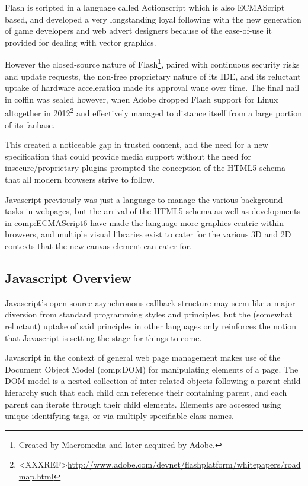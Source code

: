 Flash is scripted in a language called Actionscript which is also ECMAScript based, and developed a very longstanding loyal following with the new generation of game developers and web advert designers because of the ease-of-use it provided for dealing with vector graphics.

However the closed-source nature of Flash\footnote{Created by Macromedia and later acquired by Adobe.}, paired with continuous security risks and update requests, the non-free proprietary nature of its IDE, and its reluctant uptake of hardware acceleration made its approval wane over time. The final nail in coffin was sealed however, when Adobe dropped Flash support for Linux altogether in 2012\footnote{<XXXREF>\url{http://www.adobe.com/devnet/flashplatform/whitepapers/roadmap.html}} and effectively managed to distance itself from a large portion of its fanbase. 

This created a noticeable gap in trusted content, and the need for a new specification that could provide media support without the need for insecure/proprietary plugins prompted the conception of the HTML5 schema that all modern browsers strive to follow.

Javascript previously was just a language to manage the various background tasks in webpages, but the arrival of the HTML5 schema as well as developments in \gls{comp:ECMAScript6} have made the language more graphics-centric within browsers, and multiple visual libraries exist to cater for the various 3D and 2D contexts that the new canvas element can cater for\citep{ecmascript2011ecmascript}. 


\subsection{Javascript Overview}\label{ref:haplo:javaover}

Javascript's open-source asynchronous callback structure may seem like a major diversion from standard programming styles and principles, but the (somewhat reluctant) uptake of said principles in other languages only reinforces the notion that Javascript is setting the stage for things to come.

Javascript in the context of general web page management makes use of the Document Object Model (\gls{comp:DOM}) for manipulating elements of a page. The DOM model is a nested collection of inter-related objects following a parent-child hierarchy such that each child can reference their containing parent, and each parent can iterate through their child elements. Elements are accessed using unique identifying tags, or via multiply-specifiable class names.

